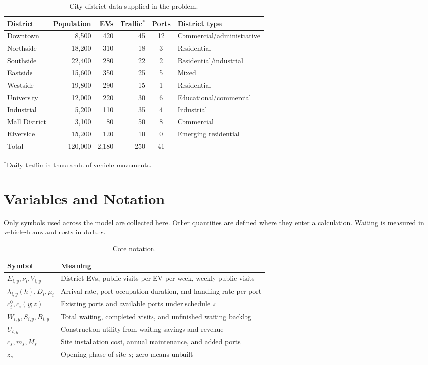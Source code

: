 \documentclass[12pt]{article}
\begin{document}
\begin{table}[htbp]\centering\small
\caption{City district data supplied in the problem.}\label{tab:districts}
\begin{tabular}{@{}lrrrcp{}@{}}\toprule
District&Population&EVs&Traffic$^*$&Ports&District type\\\midrule
Downtown&8,500&420&45&12&Commercial/administrative\\
Northside&18,200&310&18&3&Residential\\
Southside&22,400&280&22&2&Residential/industrial\\
Eastside&15,600&350&25&5&Mixed\\
Westside&19,800&290&15&1&Residential\\
University&12,000&220&30&6&Educational/commercial\\
Industrial&5,200&110&35&4&Industrial\\
Mall District&3,100&80&50&8&Commercial\\
Riverside&15,200&120&10&0&Emerging residential\\\midrule
Total&120,000&2,180&250&41&\\\bottomrule
\end{tabular}
\par\smallskip\footnotesize $^*$Daily traffic in thousands of vehicle movements.
\end{table}

\section{Variables and Notation}
Only symbols used across the model are collected here. Other quantities are defined
where they enter a calculation. Waiting is measured in vehicle-hours and costs in dollars.
\begin{table}[htbp]\centering\small
\caption{Core notation.}\label{tab:notation}
\begin{tabular}{@{}p{}p{}@{}}\toprule
Symbol & Meaning\\\midrule
$E_{i,y},\nu_i,V_{i,y}$ & District EVs, public visits per EV per week, weekly public visits\\
$\lambda_{i,y}(h),D_i,\mu_i$ & Arrival rate, port-occupation duration, and handling rate per port\\
$c_i^0,c_i(y;z)$ & Existing ports and available ports under schedule $z$\\
$W_{i,y},S_{i,y},B_{i,y}$ & Total waiting, completed visits, and unfinished waiting backlog\\
$U_{i,y}$ & Construction utility from waiting savings and revenue\\
$c_s,m_s,M_s$ & Site installation cost, annual maintenance, and added ports\\
$z_s$ & Opening phase of site $s$; zero means unbuilt\\\bottomrule
\end{tabular}\end{table}
\end{document}
